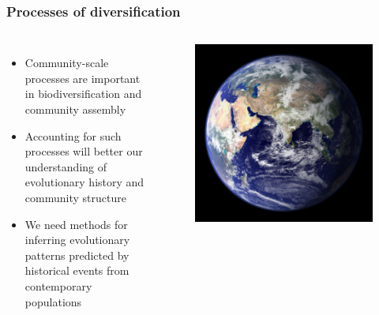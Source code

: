 {
\begin{frame}
    \frametitle{Processes of diversification}
    \begin{columns}[c]
        {
        \begin{itemize}
            \item<2-> Community-scale processes are important in
                biodiversification and community assembly
            \item<3-> Accounting for such processes will better our
                understanding of evolutionary history and
                community structure
            \item<4-> We need methods for inferring evolutionary patterns
                predicted by historical events from contemporary populations
        \end{itemize}
        }
        \begin{figure}
            \begin{center}
            \includegraphics[width=\textwidth]{../images/earth-image.jpg}
            \end{center}
        \end{figure}
    \end{columns}
\end{frame}
}

